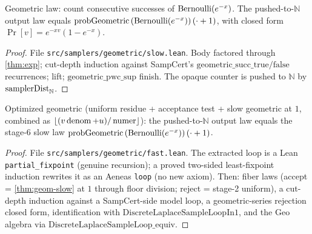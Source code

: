 \begin{theorem}\label{thm:geom-slow}
  \leanok
  Geometric law: count consecutive successes of \(\mathrm{Bernoulli}(e^{-x})\). The pushed-to-\(\mathbb{N}\)
  output law equals \(\mathrm{probGeometric}\,(\mathrm{Bernoulli}(e^{-x}))\,(\cdot+1)\), with closed form
  \(\Pr[v] = e^{-xv}(1-e^{-x})\). \statusDone
\end{theorem}
\begin{proof}\leanok
  File \texttt{src/samplers/geometric/slow.lean}. Body factored through
  \ref{thm:exp}; cut-depth induction against SampCert's
  \(\mathrm{geometric\_succ\_true/false}\) recurrences; lift;
  \(\mathrm{geometric\_pwc\_sup}\) finish. The opaque counter is pushed to
  \(\mathbb{N}\) by \(\mathrm{samplerDist}_{\mathbb{N}}\).
\end{proof}

\begin{theorem}\label{thm:geom-fast}
  \leanok
  Optimized geometric (uniform residue + acceptance test + slow geometric at \(1\),
  combined as \(\lfloor(v\operatorname{denom}+u)/\operatorname{numer}\rfloor\)): the pushed-to-\(\mathbb{N}\)
  output law equals the stage-6 slow law
  \(\mathrm{probGeometric}\,(\mathrm{Bernoulli}(e^{-x}))\,(\cdot+1)\). \statusDone
\end{theorem}
\begin{proof}\leanok
  File \texttt{src/samplers/geometric/fast.lean}. The extracted loop is a Lean
  \texttt{partial\_fixpoint} (genuine recursion); a proved two-sided least-fixpoint
  induction rewrites it as an Aeneas \texttt{loop} (no new axiom). Then: fiber laws
  (accept = \ref{thm:geom-slow} at \(1\) through floor division; reject = stage-2
  uniform), a cut-depth induction against a SampCert-side model loop, a geometric-series
  rejection closed form, identification with
  \(\mathrm{DiscreteLaplaceSampleLoopIn1}\), and the \(\mathrm{Geo}\) algebra via
  \(\mathrm{DiscreteLaplaceSampleLoop\_equiv}\).
\end{proof}

